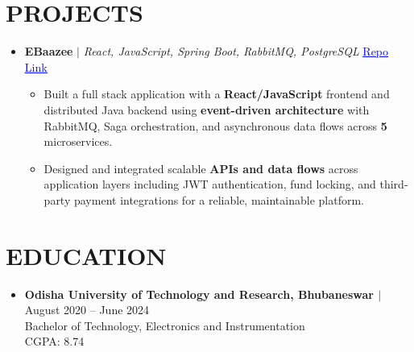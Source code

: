\documentclass[a4paper,11pt]{article}
\begin{document}
\section{PROJECTS}
\begin{itemize}[leftmargin=0in, label={}]
  \item
    \textbf{EBaazee} $|$ \textit{React, JavaScript, Spring Boot, RabbitMQ, PostgreSQL} \hfill
    \href{https://github.com/BITSSAP2025AugAPIBP3Sections/APIBP-20242YB-Team-01}{\textcolor{blue}{\underline{Repo Link}}}
    \begin{itemize}[leftmargin=0.18in, itemsep=0.5pt, topsep=1pt]
      \item \small{Built a full stack application with a \textbf{React/JavaScript} frontend and distributed Java backend using \textbf{event-driven architecture} with RabbitMQ, Saga orchestration, and asynchronous data flows across \textbf{5} microservices.}
      \item \small{Designed and integrated scalable \textbf{APIs and data flows} across application layers including JWT authentication, fund locking, and third-party payment integrations for a reliable, maintainable platform.}
    \end{itemize}

\end{itemize}


\section{EDUCATION}
\begin{itemize}[leftmargin=0in, label={}]
  \item
    \textbf{\normalsize Odisha University of Technology and Research, Bhubaneswar $|$ }August 2020 -- June 2024 \\
    \normalsize Bachelor of Technology, Electronics and Instrumentation \\
    \normalsize CGPA: 8.74
\end{itemize}

\end{document}

